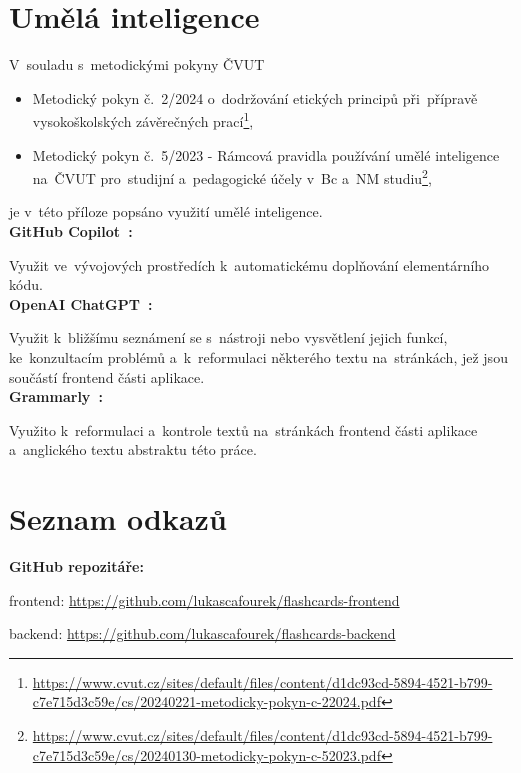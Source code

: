 \documentclass[twoside]{ctuthesis}
\begin{document}
\appendix

\chapter{Umělá inteligence}

V~souladu s~metodickými pokyny ČVUT 
\begin{itemize}
\item Metodický pokyn č.~2/2024 o~dodržování etických principů při~přípravě vysokoškolských závěrečných prací\footnote{\url{https://www.cvut.cz/sites/default/files/content/d1dc93cd-5894-4521-b799-c7e715d3c59e/cs/20240221-metodicky-pokyn-c-22024.pdf}},
\item Metodický pokyn č.~5/2023 - Rámcová pravidla používání umělé inteligence na~ČVUT pro~studijní a~pedagogické účely v~Bc a~NM studiu\footnote{\url{https://www.cvut.cz/sites/default/files/content/d1dc93cd-5894-4521-b799-c7e715d3c59e/cs/20240130-metodicky-pokyn-c-52023.pdf}},
\end{itemize}
je v~této příloze popsáno využití umělé inteligence. \\

\noindent \textbf{GitHub Copilot~\cite{copilot}:}

Využit ve~vývojových prostředích k~automatickému doplňování elementárního kódu. \\

\noindent \textbf{OpenAI ChatGPT~\cite{gpt}:}

Využit k~bližšímu seznámení se s~nástroji nebo vysvětlení jejich funkcí, ke~konzultacím problémů a~k~reformulaci některého textu na~stránkách, jež jsou součástí frontend části aplikace. \\

\noindent \textbf{Grammarly~\cite{grammarly}:}

Využito k~reformulaci a~kontrole textů na~stránkách frontend části aplikace a~anglického textu abstraktu této práce.

\appendix

\chapter{Seznam odkazů}

\noindent \textbf{GitHub repozitáře:}

frontend: \url{https://github.com/lukascafourek/flashcards-frontend}

backend: \url{https://github.com/lukascafourek/flashcards-backend} \\
\end{document}
